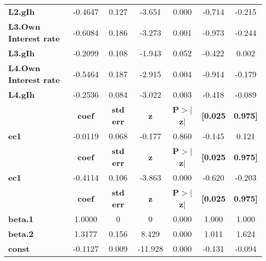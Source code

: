 \begin{center}
\begin{tabular}{lcccccc}
\textbf{L2.gIh}               &      -0.4647  &        0.127     &    -3.651  &         0.000        &       -0.714    &       -0.215     \\
\textbf{L3.Own Interest rate} &      -0.6084  &        0.186     &    -3.273  &         0.001        &       -0.973    &       -0.244     \\
\textbf{L3.gIh}               &      -0.2099  &        0.108     &    -1.943  &         0.052        &       -0.422    &        0.002     \\
\textbf{L4.Own Interest rate} &      -0.5464  &        0.187     &    -2.915  &         0.004        &       -0.914    &       -0.179     \\
\textbf{L4.gIh}               &      -0.2536  &        0.084     &    -3.022  &         0.003        &       -0.418    &       -0.089     \\
             & \textbf{coef} & \textbf{std err} & \textbf{z} & \textbf{P$> |$z$|$} & \textbf{[0.025} & \textbf{0.975]}  \\
\midrule
\textbf{ec1} &      -0.0119  &        0.068     &    -0.177  &         0.860        &       -0.145    &        0.121     \\
             & \textbf{coef} & \textbf{std err} & \textbf{z} & \textbf{P$> |$z$|$} & \textbf{[0.025} & \textbf{0.975]}  \\
\midrule
\textbf{ec1} &      -0.4114  &        0.106     &    -3.863  &         0.000        &       -0.620    &       -0.203     \\
                & \textbf{coef} & \textbf{std err} & \textbf{z} & \textbf{P$> |$z$|$} & \textbf{[0.025} & \textbf{0.975]}  \\
\midrule
\textbf{beta.1} &       1.0000  &            0     &         0  &         0.000        &        1.000    &        1.000     \\
\textbf{beta.2} &       1.3177  &        0.156     &     8.429  &         0.000        &        1.011    &        1.624     \\
\textbf{const}  &      -0.1127  &        0.009     &   -11.928  &         0.000        &       -0.131    &       -0.094     \\
\bottomrule
\end{tabular}
\end{center}